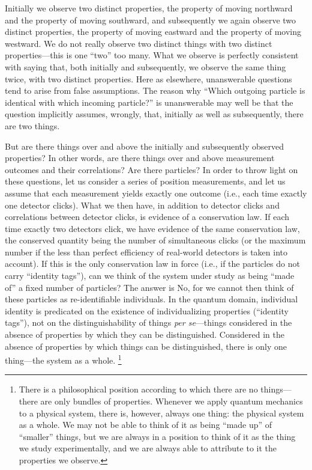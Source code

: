 Initially we observe two distinct properties, the property of moving northward and the property of moving southward, and subsequently we again observe two distinct properties, the property of moving eastward and the property of moving westward. We do not really observe two distinct things with two distinct properties---this is one ``two'' too many. What we observe is perfectly consistent with saying that, both initially and subsequently, we observe the same thing twice, with two distinct properties. Here as elsewhere, unanswerable questions tend to arise from false assumptions. The reason why ``Which outgoing particle is identical with which incoming particle?'' is unanswerable may well be that the question implicitly assumes, wrongly, that, initially as well as subsequently, there are two things.

But are there things over and above the initially and subsequently observed properties? In other words, are there things over and above measurement outcomes and their correlations? Are there particles? In order to throw light on these questions, let us consider a series of position measurements, and let us assume that each measurement yields exactly one outcome (i.e., each time exactly one detector clicks). What we then have, in addition to detector clicks and correlations between detector clicks, is evidence of a conservation law. If each time exactly two detectors click, we have evidence of the same conservation law, the conserved quantity being the number of simultaneous clicks (or the maximum number if the less than perfect efficiency of real-world detectors is taken into account). If this is the only conservation law in force (i.e., if the particles do not carry ``identity tags''), can we think of the system under study as being ``made of'' a fixed number of particles? The answer is No, for we cannot then think of these particles as re-identifiable individuals. In the quantum domain, individual identity is predicated on the existence of individualizing properties (``identity tags''), not on the distinguishability of things \emph{per se}---things considered in the absence of properties by which they can be distinguished. Considered in the absence of properties by which things can be distinguished, there is only one thing---the system as a whole.%
\footnote{There is a philosophical position according to which there are no things---there are only bundles of properties. Whenever we apply quantum mechanics to a physical system, there is, however, always one thing: the physical system as a whole. We may not be able to think of it as being ``made up'' of ``smaller'' things, but we are always in a position to think of it as the thing we study experimentally, and we are always able to attribute to it the properties we observe.} 

